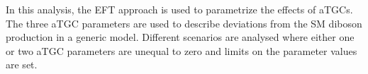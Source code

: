 \noindent In this analysis, the EFT approach is used to parametrize the effects of aTGCs. The three aTGC parameters are used to describe deviations from the SM diboson production in a generic model. Different scenarios are analysed where either one or two aTGC parameters are unequal to zero and limits on the parameter values are set.
